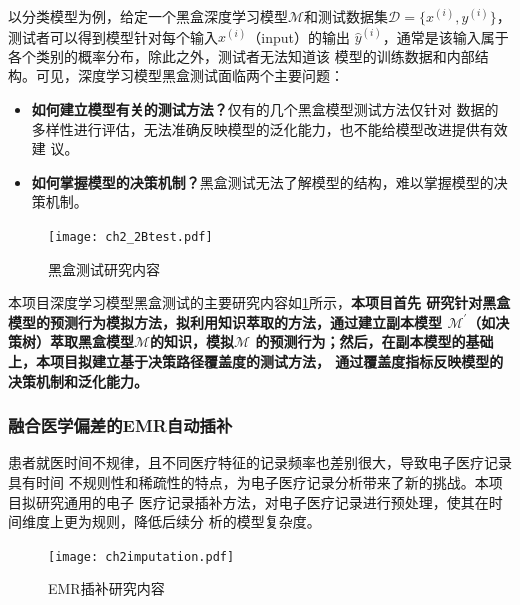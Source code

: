 以分类模型为例，给定一个黑盒深度学习模型$\mathcal M$和测试数据集$\mathcal
D=\{x^{(i)},y^{(i)}\}$，测试者可以得到模型针对每个输入$x^{(i)}$（input）的输出
$\hat{y}^{(i)}$，通常是该输入属于各个类别的概率分布，除此之外，测试者无法知道该
模型的训练数据和内部结构。可见，深度学习模型黑盒测试面临两个主要问题：
\begin{itemize}
    \item \textbf{如何建立模型有关的测试方法？}仅有的几个黑盒模型测试方法仅针对
    数据的多样性进行评估，无法准确反映模型的泛化能力，也不能给模型改进提供有效建
    议。
    \item \textbf{如何掌握模型的决策机制？}黑盒测试无法了解模型的结构，难以掌握模型的决策机制。
\end{itemize}

\begin{figure}
    \begin{small}
        \begin{center}
            \texttt{[image: ch2\_2Btest.pdf]}
        \end{center}
        \caption{黑盒测试研究内容}
        \label{fig:ch2:2Btest}
    \end{small}
\end{figure}
本项目深度学习模型黑盒测试的主要研究内容如\cref{fig:ch2:2Btest}所示，\textbf{本项目首先
研究针对黑盒模型的预测行为模拟方法，拟利用知识萃取的方法，通过建立副本模型
$\mathcal M^\prime$（如决策树）萃取黑盒模型$\mathcal M$的知识，模拟$\mathcal M$
的预测行为；然后，在副本模型的基础上，本项目拟建立基于决策路径覆盖度的测试方法，
通过覆盖度指标反映模型的决策机制和泛化能力。}

\subsubsection{融合医学偏差的EMR自动插补}

患者就医时间不规律，且不同医疗特征的记录频率也差别很大，导致电子医疗记录具有时间
不规则性和稀疏性的特点，为电子医疗记录分析带来了新的挑战。本项目拟研究通用的电子
医疗记录插补方法，对电子医疗记录进行预处理，使其在时间维度上更为规则，降低后续分
析的模型复杂度。

\begin{figure}
    \begin{small}
        \begin{center}
            \texttt{[image: ch2imputation.pdf]}
        \end{center}
        \caption{EMR插补研究内容}
        \label{fig:ch2:imputation}
    \end{small}
\end{figure}


